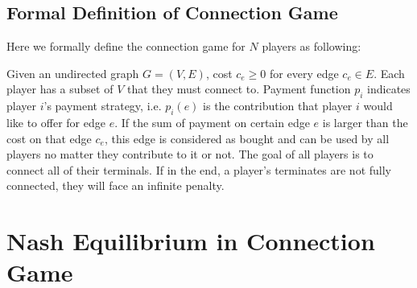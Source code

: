 \documentclass[11pt,psfig,times]{article}
\begin{document}
\subsection{Formal Definition of Connection Game}
Here we formally define the connection game for \(N\) players as following:

Given an undirected graph \(G = (V,E)\), cost \(c_e \geq 0\) for every edge $c_e \in E$. Each player has a subset of \(V\) that they must connect to. Payment function \(p_i\) indicates player $i$'s payment strategy, i.e. \(p_i(e)\) is the contribution that player \(i\) would like to offer for edge \(e\). If the sum of payment on certain edge \(e\) is larger than the cost on that edge \(c_e\), this edge is considered as bought and can be used by all players no matter they contribute to it or not. The goal of all players is to connect all of their terminals. If in the end, a player's terminates are not fully connected, they will face an infinite penalty.  

\section{Nash Equilibrium in Connection Game}
\end{document}
